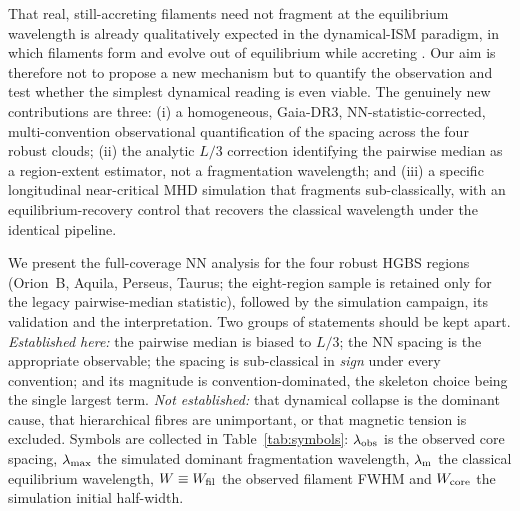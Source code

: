 \documentclass[usenatbib,twoside,twocolumn]{mnras}
\begin{document}
That real, still-accreting filaments need not fragment at the equilibrium wavelength is already qualitatively expected in the dynamical-ISM paradigm, in which filaments form and evolve out of equilibrium while accreting \citep{Andre2014,Clarke2016,Clarke2017,Clarke2020}. Our aim is therefore not to propose a new mechanism but to quantify the observation and test whether the simplest dynamical reading is even viable. The genuinely new contributions are three: (i) a homogeneous, Gaia-DR3, NN-statistic-corrected, multi-convention observational quantification of the spacing across the four robust clouds; (ii) the analytic $L/3$ correction identifying the pairwise median as a region-extent estimator, not a fragmentation wavelength; and (iii) a specific longitudinal near-critical MHD simulation that fragments sub-classically, with an equilibrium-recovery control that recovers the classical wavelength under the identical pipeline.

We present the full-coverage NN analysis for the four robust HGBS regions (Orion~B, Aquila, Perseus, Taurus; the eight-region sample is retained only for the legacy pairwise-median statistic), followed by the simulation campaign, its validation and the interpretation. Two groups of statements should be kept apart. \emph{Established here:} the pairwise median is biased to $L/3$; the NN spacing is the appropriate observable; the spacing is sub-classical in \emph{sign} under every convention; and its magnitude is convention-dominated, the skeleton choice being the single largest term. \emph{Not established:} that dynamical collapse is the dominant cause, that hierarchical fibres are unimportant, or that magnetic tension is excluded. Symbols are collected in Table~\ref{tab:symbols}: $\lambda_{\rm obs}$ is the observed core spacing, $\lambda_{\rm max}$ the simulated dominant fragmentation wavelength, $\lambda_{\rm m}$ the classical equilibrium wavelength, $W\equiv W_{\rm fil}$ the observed filament FWHM and $W_{\rm core}$ the simulation initial half-width.
\end{document}

